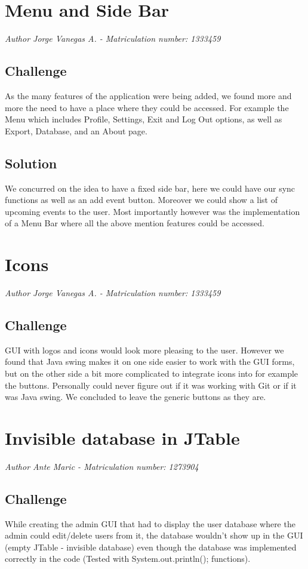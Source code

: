\section{Menu and Side Bar}
\emph{Author Jorge Vanegas A. - Matriculation number: 1333459}

\subsection{Challenge}
As the many features of the application were being added, we found more and more the need to have a place where they could be accessed. For example the Menu which includes Profile, Settings, Exit and Log Out options, as well as Export, Database, and an About page.

\subsection{Solution}
We concurred on the idea to have a fixed side bar, here we could have our sync functions as well as an add event button. Moreover we could show a list of upcoming events to the user. Most importantly however was the implementation of a Menu Bar where all the above mention features could be accessed.

\section{Icons}
\emph{Author Jorge Vanegas A. - Matriculation number: 1333459}

\subsection{Challenge}
GUI with logos and icons would look more pleasing to the user. However we found that Java swing makes it on one side easier to work with the GUI forms, but on the other side a bit more complicated to integrate icons into for example the buttons. Personally could never figure out if it was working with Git or if it was Java swing. We concluded to leave the generic buttons as they are.

\section{Invisible database in JTable}
\emph{Author Ante Maric - Matriculation number: 1273904}

\subsection{Challenge}
While creating the admin GUI that had to display the user database where the admin could edit/delete users from it, the database wouldn't show up in the GUI (empty JTable - invisible database) even though the database was implemented correctly in the code (Tested with System.out.println(); functions).


